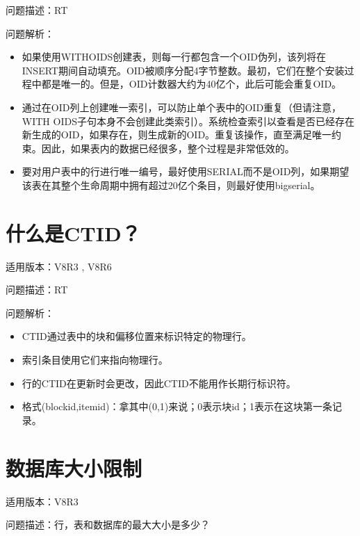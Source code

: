 \documentclass[letterpaper,10pt,english]{sphinxmanual}
\begin{document}
问题描述：RT

问题解析：
\begin{itemize}
\item {} 
如果使用WITHOIDS创建表，则每一行都包含一个OID伪列，该列将在INSERT期间自动填充。OID被顺序分配4字节整数。最初，它们在整个安装过程中都是唯一的。但是，OID计数器大约为40亿个，此后可能会重复OID。

\item {} 
通过在OID列上创建唯一索引，可以防止单个表中的OID重复（但请注意，WITH OIDS子句本身不会创建此类索引）。系统检查索引以查看是否已经存在新生成的OID，如果存在，则生成新的OID。重复该操作，直至满足唯一约束。因此，如果表内的数据已经很多，整个过程是非常低效的。

\item {} 
要对用户表中的行进行唯一编号，最好使用SERIAL而不是OID列，如果期望该表在其整个生命周期中拥有超过20亿个条目，则最好使用bigserial。

\end{itemize}


\section{什么是CTID？}
\label{\detokenize{sql:ctid}}
适用版本：V8R3 , V8R6

问题描述：RT

问题解析：
\begin{itemize}
\item {} 
CTID通过表中的块和偏移位置来标识特定的物理行。

\item {} 
索引条目使用它们来指向物理行。

\item {} 
行的CTID在更新时会更改，因此CTID不能用作长期行标识符。

\item {} 
格式(blockid,itemid)：拿其中(0,1)来说；0表示块id；1表示在这块第一条记录。

\end{itemize}


\section{数据库大小限制}
\label{\detokenize{sql:id15}}
适用版本：V8R3

问题描述：行，表和数据库的最大大小是多少？
\end{document}
